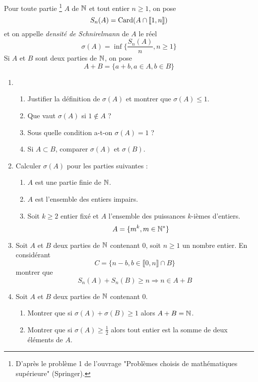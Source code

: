 
Pour toute partie \footnote{D'après le problème 1 de l'ouvrage "Problèmes choisis de mathématiques supérieure" (Springer).} $A$ de $\mathbb{N}$ et tout entier $n\geq1$, on pose
\[S_n(A)=\operatorname{Card}(A\cap \llbracket 1,n \rrbracket)\]
et on appelle \emph{densité de Schnirelmann} de $A$ le réel
\[\sigma (A)= \inf \{\frac{S_n(A)}{n}, n\geq 1\}\]
Si $A$ et $B$ sont deux parties de $\mathbb{N}$, on pose
\[A+B=\{a+b, a\in A , b\in B\}\]
\begin{enumerate}
\item \begin{enumerate}
  \item Justifier la définition de $\sigma (A)$ et montrer que $\sigma(A) \leq 1$.
  \item Que vaut $\sigma(A)$ si $1\not \in A$ ?
  \item Sous quelle condition a-t-on $\sigma (A)=1 $ ?
  \item Si $A \subset B$, comparer $\sigma (A)$ et $\sigma (B)$.
      \end{enumerate}
\item Calculer $\sigma (A)$ pour les parties suivantes :
\begin{enumerate}
  \item $A$ est une partie finie de $\mathbb{N}$.
  \item $A$ est l'ensemble des entiers impairs.
  \item Soit $k\geq 2$ entier fixé et $A$ l'ensemble des puissances $k$-ièmes d'entiers.
\begin{displaymath}
 A=\{m^k, m\in \mathbb{N} ^*\}
\end{displaymath}
      \end{enumerate}
\item Soit $A$ et $B$ deux parties de $\mathbb{N}$ contenant $0$, soit $n\geq 1$ un nombre entier. En considérant
\[
C=\{n-b, b\in\llbracket 0,n \rrbracket \cap B\}
\]
montrer que
\[
S_n(A)+S_n(B)\geq n \Rightarrow n\in A+B
\]
\item Soit $A$ et $B$ deux parties de $\mathbb{N}$ contenant $0$.
\begin{enumerate}
  \item Montrer que si $\sigma (A)+\sigma (B) \geq 1$ alors $A+B=\mathbb{N}$.
  \item Montrer que si $\sigma (A)\geq \frac{1}{2}$ alors tout entier est la somme de deux éléments de $A$.
\end{enumerate}

\end{enumerate} 